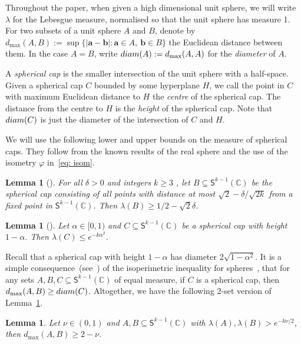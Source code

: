 \documentclass[10pt,a4paper]{article}
\newcommand{\V}[1]{\mathbold{#1}}
\newtheorem{lemma}[theorem]{Lemma}
\theoremstyle{definition}
\newcommand{\diam}[1]{{\rm{diam}}(#1)}
\newcommand{\sS}{\mathsf{S}}
\newcommand{\sC}{\mathbb{C}}
\begin{document}
Throughout the paper, when given a high dimensional unit sphere, we will write $\lambda$ for the Lebesgue measure, normalised so that the unit sphere has measure 1. For two subsets of a unit sphere $A$ and $B$, denote by $d_{\max}(A,B):=\sup\{|\V{a}-\V{b}|: \V{a}\in A,~\V{b}\in B \}$ the Euclidean distance between them. In the case $A=B$, write $\diam{A}:=d_{\max}(A,A)$ for the \emph{diameter} of $A$.  

A \emph{spherical cap} is the smaller intersection of the unit sphere with a half-space. Given a spherical cap $C$ bounded by some hyperplane $H$, we call the point in $C$ with maximum Euclidean distance to $H$ the \emph{centre} of the spherical cap. The distance from the centre to $H$ is the \emph{height} of the spherical cap. Note that $\diam{C}$ is just the diameter of the intersection of $C$ and $H$. 

We will use the following lower and upper bounds on the measure of spherical caps. They follow from the known results of the real sphere and the use of the isometry $\varphi$ in~\eqref{eq: isom}.



\begin{lemma}[\cite{BL-1}]\label{lem:cap-LB}
	For all $\delta>0$ and integers $k\ge 3$ , let $B\subseteq \sS^{k-1}(\sC)$ be the spherical cap consisting of all points with distance at most $\sqrt{2}-\delta/\sqrt{2k}$ from a fixed point in $\sS^{k-1}(\sC)$. Then $\lambda(B)\ge 1/2-\sqrt{2}\delta$.
\end{lemma}


\begin{lemma}[\cite{Tkocz}]\label{lem:cap-UB}
	Let $\alpha\in [0,1)$ and $C\subseteq \sS^{k-1}(\sC)$ be a spherical cap with height $1-\alpha$. Then $\lambda(C)\le e^{-k\alpha^2}$.
\end{lemma}

Recall that a spherical cap with height $1-\alpha$ has diameter $2\sqrt{1-\alpha^2}$.
It is a simple consequence~(see~\cite{BL-1}) of the isoperimetric inequality for spheres~\cite{Schmidt}, that for any sets $A,B,C\subseteq \sS^{k-1}(\sC)$ of equal measure, if $C$ is a spherical cap, then $d_{\max}(A,B)\ge \diam{C}$. Altogether, we have the following 2-set version of Lemma~\ref{lem:cap-UB}.

\begin{lemma}\label{lem:cap-2set}
	Let $\nu\in (0,1)$ and $A,B\subseteq\sS^{k-1}(\sC)$ with $\lambda(A), \lambda(B)>e^{-k\nu/2}$, then $d_{\max}(A,B)\ge 2-\nu$.
\end{lemma}
\end{document}
